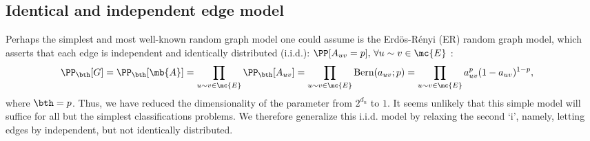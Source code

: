 % 
% 


\subsection{Identical and independent edge model} %
\label{sub:ER}


Perhaps the simplest and most well-known random graph model one could assume is the Erd\"os-R\'enyi (ER) random graph model, which asserts that each edge is independent and identically distributed (i.i.d.): $\PP[A_{uv}=\pp], \, \forall u \sim v \in \mc{E}$ \cite{ER, Bollobas}: %
\begin{align}
	\PP_{\bth}[G]&=\PP_{\bth}[\mb{A}]=\prod_{u \sim v \in \mc{E}} \PP_{\bth}[A_{uv}] %
	= \prod_{u \sim v \in \mc{E}} \text{Bern}(a_{uv}; \pp) = \prod_{u \sim v \in \mc{E}} a_{uv}^{\pp}(1-a_{uv})^{1-\pp},
\end{align}
where $\bth=\pp$.  Thus, we have reduced the dimensionality of the parameter from $2^{d_n}$ to $1$. It seems unlikely that this simple model will suffice for all but the simplest classifications problems.
We therefore generalize this i.i.d. model by relaxing the second `i', namely, letting edges by independent, but not identically distributed.  

